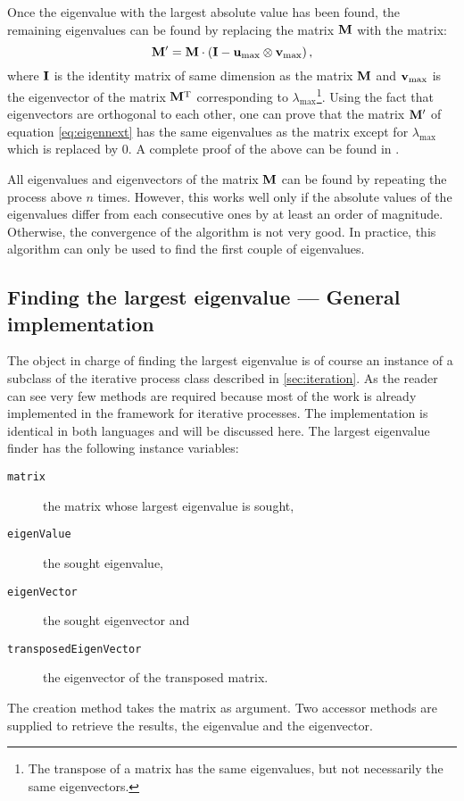 \documentclass[twoside]{book}
\begin{document}
Once the eigenvalue with the largest absolute value has been
found, the remaining eigenvalues can be found by replacing the
matrix ${\bf M}$ with the matrix:
\begin{equation}
\label{eq:eigennext}
  {\bf M}^{\prime}={\bf M}\cdot\left({\bf I}-{\bf u}_{\max}\otimes{\bf
  v}_{\max}\right),
\end{equation}
where ${\bf I}$ is the identity matrix of same dimension as the
matrix ${\bf M}$ and ${\bf v}_{\max}$ is the eigenvector of the
matrix ${\bf M}^{\mathop{\rm T}}$ corresponding to
$\lambda_{\max}$\footnote{The transpose of a matrix has the same
eigenvalues, but not necessarily the same eigenvectors.}. Using
the fact that eigenvectors are orthogonal to each other, one can
prove that the matrix ${\bf M}^{\prime}$ of equation
\ref{eq:eigennext} has the same eigenvalues as the matrix except
for $\lambda_{\max}$ which is replaced by 0. A complete proof of
the above can be found in \cite{Bass}.

All eigenvalues and eigenvectors of the matrix ${\bf M}$ can be
found by repeating the process above $n$ times. However, this
works well only if the absolute values of the eigenvalues differ
from each consecutive ones by at least an order of magnitude.
Otherwise, the convergence of the algorithm is not very good. In
practice, this algorithm can only be used to find the first couple
of eigenvalues.

\subsection{Finding the largest eigenvalue --- General
implementation} The object in
charge of finding the largest eigenvalue is of course an instance
of a subclass of the iterative process class described in
\ref{sec:iteration}. As the reader can see very few methods are
required because most of the work is already implemented in the
framework for iterative processes. The implementation is identical
in both languages and will be discussed here. The largest
eigenvalue finder has the following instance variables:
\begin{description}
  \item[\tt matrix] the matrix whose largest eigenvalue is sought,
  \item[\tt eigenValue] the sought eigenvalue,
  \item[\tt eigenVector] the sought eigenvector and
  \item[\tt transposedEigenVector] the eigenvector of the
  transposed matrix.
\end{description}
The creation method takes the matrix as argument. Two accessor
methods are supplied to retrieve the results, the eigenvalue and
the eigenvector.
\end{document}
